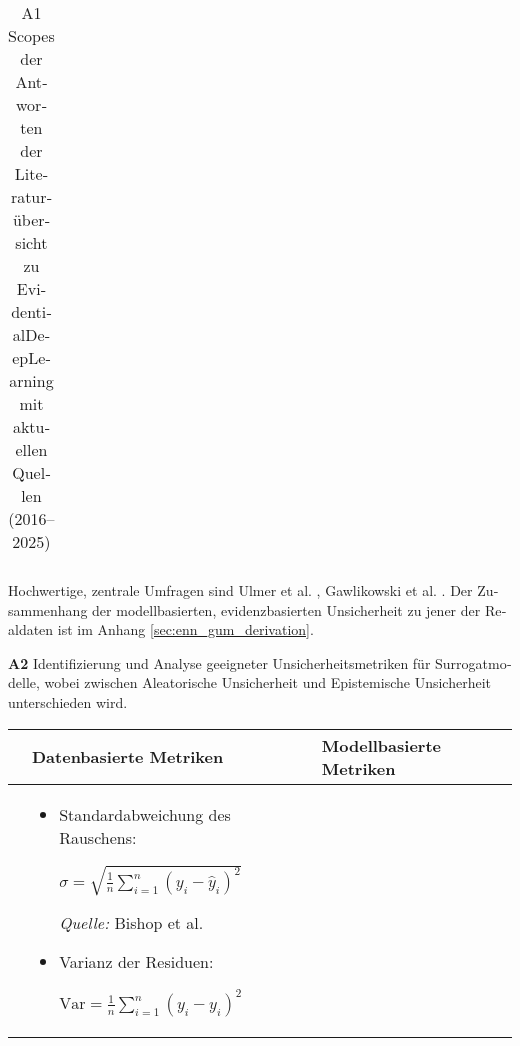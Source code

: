 \begin{otherlanguage}{ngerman}
\begin{footnotesize}
\begin{longtable}{|>{\centering\arraybackslash}p{0.8cm}|p{11.8cm}|p{0.8cm}|}
\caption{A1 Scopes der Antworten der Literaturübersicht zu \gls{EvidentialDeepLearning} mit aktuellen Quellen (2016–2025)}
\label{tab:edl_scopes_sources_updated}

\end{longtable}
\end{footnotesize}

Hochwertige, zentrale Umfragen sind Ulmer et al. \parencite{Ulmer2023}, Gawlikowski et al. \parencite{Gawlikowski2023}. 
Der Zusammenhang der modellbasierten, evidenzbasierten Unsicherheit zu jener der Realdaten ist im Anhang \ref{sec:enn_gum_derivation}.

\pagebreak


\textbf{A2} Identifizierung und Analyse geeigneter Unsicherheitsmetriken für Surrogatmodelle, wobei zwischen \gls{Aleatorische Unsicherheit} und \gls{Epistemische Unsicherheit} unterschieden wird.

\begin{table}[!htpb]
  \centering
  \scriptsize
  \begin{tabularx}{\textwidth}{|>{\centering\arraybackslash}l|X|X|}
    \hline
    & \hspace{0.6em}\textbf{Datenbasierte Metriken} & \hspace{0.6em}\textbf{Modellbasierte Metriken} \\
    \hline

    \multirow{10}{*}{\textbf{\gls{Aleatorische Unsicherheit}}} &
    \parbox[t]{\linewidth}{
      \begin{itemize}[topsep=0em, itemsep=0.4em, leftmargin=*, label={}]
        \item Standardabweichung des Rauschens:
        
        \( \sigma = \sqrt{\frac{1}{n} \sum_{i=1}^{n} (y_i - \hat{y}_i)^2} \)
        
        \begin{scriptsize}\textit{Quelle:} Bishop et al. \parencite[S.~28–30]{bishop2006pattern}\end{scriptsize}
        
        \item Varianz der Residuen:
        
        \( \text{Var} = \frac{1}{n} \sum_{i=1}^{n} (y_i - \hat{y}_i)^2 \)
        

\end{itemize}}
\end{tabularx}
\end{table}
\end{otherlanguage}
